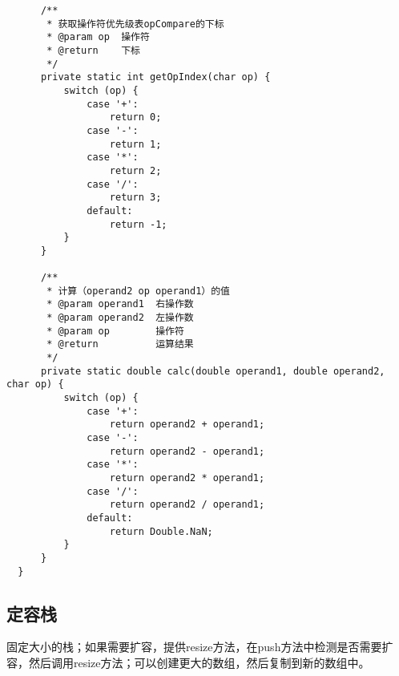 \documentclass{article}
\begin{document}
\begin{verbatim}
      /**
       * 获取操作符优先级表opCompare的下标
       * @param op  操作符
       * @return    下标
       */
      private static int getOpIndex(char op) {
          switch (op) {
              case '+':
                  return 0;
              case '-':
                  return 1;
              case '*':
                  return 2;
              case '/':
                  return 3;
              default:
                  return -1;
          }
      }

      /**
       * 计算（operand2 op operand1）的值
       * @param operand1  右操作数
       * @param operand2  左操作数
       * @param op        操作符
       * @return          运算结果
       */
      private static double calc(double operand1, double operand2, char op) {
          switch (op) {
              case '+':
                  return operand2 + operand1;
              case '-':
                  return operand2 - operand1;
              case '*':
                  return operand2 * operand1;
              case '/':
                  return operand2 / operand1;
              default:
                  return Double.NaN;
          }
      }
  }
  \end{verbatim}

  \subsection{定容栈}
  固定大小的栈；如果需要扩容，提供resize方法，在push方法中检测是否需要扩容，然后调用resize方法；可以创建更大的数组，然后复制到新的数组中。
\end{document}
